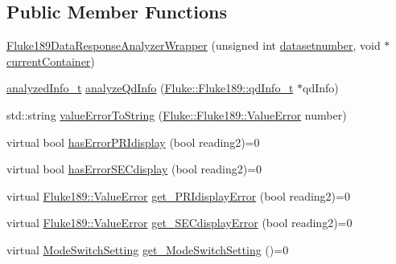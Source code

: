 \subsection*{Public Member Functions}
\begin{DoxyCompactItemize}
\item 
\hyperlink{classFluke_1_1Fluke189DataResponseAnalyzerWrapper_af4f891231353edf2c9a20743d3018b1e}{Fluke189DataResponseAnalyzerWrapper} (unsigned int \hyperlink{classFluke_1_1Fluke189DataResponseAnalyzerWrapper_a568ccec1349cc6b278fb0791182bc7b4}{datasetnumber}, void $\ast$\hyperlink{classFluke_1_1Fluke189DataResponseAnalyzerWrapper_aa0096243be3694f7993022733703697a}{currentContainer})
\item 
\hyperlink{structFluke_1_1Fluke189DataResponseAnalyzerWrapper_1_1analyzedInfo__t}{analyzedInfo\_\-t} \hyperlink{classFluke_1_1Fluke189DataResponseAnalyzerWrapper_a2bec1dad601bc993375d358ef77c7e6b}{analyzeQdInfo} (\hyperlink{structFluke_1_1Fluke189_1_1qdInfo__t}{Fluke::Fluke189::qdInfo\_\-t} $\ast$qdInfo)
\item 
std::string \hyperlink{classFluke_1_1Fluke189DataResponseAnalyzerWrapper_ac6af92576728d360cf3e0d462d07dd27}{valueErrorToString} (\hyperlink{classFluke_1_1Fluke189_a5dc0eaffde0a29a64cbcbd50d4178491}{Fluke::Fluke189::ValueError} number)
\item 
virtual bool \hyperlink{classFluke_1_1Fluke189DataResponseAnalyzerWrapper_a831296ad9286753efede158c207adc19}{hasErrorPRIdisplay} (bool reading2)=0
\item 
virtual bool \hyperlink{classFluke_1_1Fluke189DataResponseAnalyzerWrapper_aa78f02012a5f1803c080bae3e6121286}{hasErrorSECdisplay} (bool reading2)=0
\item 
virtual \hyperlink{classFluke_1_1Fluke189_a5dc0eaffde0a29a64cbcbd50d4178491}{Fluke189::ValueError} \hyperlink{classFluke_1_1Fluke189DataResponseAnalyzerWrapper_ad10698c83895619a6fbf251c1256ce11}{get\_\-PRIdisplayError} (bool reading2)=0
\item 
virtual \hyperlink{classFluke_1_1Fluke189_a5dc0eaffde0a29a64cbcbd50d4178491}{Fluke189::ValueError} \hyperlink{classFluke_1_1Fluke189DataResponseAnalyzerWrapper_aaf53f3e129ae21be4abe85bf4998fed5}{get\_\-SECdisplayError} (bool reading2)=0
\item 
virtual \hyperlink{classFluke_1_1Fluke189DataResponseAnalyzerWrapper_a2ec2700a6086ae0ebd9601fe0c0f957a}{ModeSwitchSetting} \hyperlink{classFluke_1_1Fluke189DataResponseAnalyzerWrapper_a18e1b686e50a4cc3a7023c646f66a35c}{get\_\-ModeSwitchSetting} ()=0
\item 

\end{DoxyCompactItemize}
